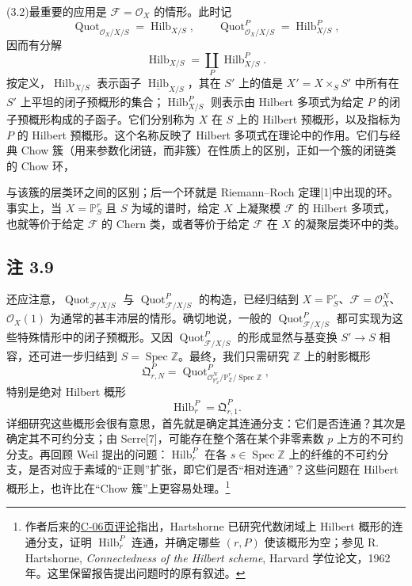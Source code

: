 (3.2)最重要的应用是 $\mathcal F=\mathcal O_X$ 的情形。此时记
\[
\operatorname{Quot}_{\mathcal O_X/X/S}=\operatorname{Hilb}_{X/S},\qquad
\operatorname{Quot}^P_{\mathcal O_X/X/S}=\operatorname{Hilb}^P_{X/S},
\]
因而有分解
\[
\operatorname{Hilb}_{X/S}=\coprod_P\operatorname{Hilb}^P_{X/S}.
\]
按定义，$\operatorname{Hilb}_{X/S}$ 表示函子 $\underline{\operatorname{Hilb}}_{X/S}$，其在 $S'$ 上的值是 $X'=X\times_SS'$ 中所有在 $S'$ 上平坦的闭子预概形的集合；$\operatorname{Hilb}^P_{X/S}$ 则表示由 Hilbert 多项式为给定 $P$ 的闭子预概形构成的子函子。它们分别称为 $X$ 在 $S$ 上的 Hilbert 预概形，以及指标为 $P$ 的 Hilbert 预概形。这个名称反映了 Hilbert 多项式在理论中的作用。它们与经典 Chow 簇（用来参数化闭链，而非簇）在性质上的区别，正如一个簇的闭链类的 Chow 环，

与该簇的层类环之间的区别；后一个环就是 Riemann--Roch 定理[1]中出现的环。事实上，当 $X=\mathbb P^r_S$ 且 $S$ 为域的谱时，给定 $X$ 上凝聚模 $\mathcal F$ 的 Hilbert 多项式，也就等价于给定 $\mathcal F$ 的 Chern 类，或者等价于给定 $\mathcal F$ 在 $X$ 的凝聚层类环中的类。

\subsection*{注 3.9}
还应注意，$\operatorname{Quot}_{\mathcal F/X/S}$ 与 $\operatorname{Quot}^P_{\mathcal F/X/S}$ 的构造，已经归结到 $X=\mathbb P^r_S$、$\mathcal F=\mathcal O_X^N$、$\mathcal O_X(1)$ 为通常的甚丰沛层的情形。确切地说，一般的 $\operatorname{Quot}^P_{\mathcal F/X/S}$ 都可实现为这些特殊情形中的闭子预概形。又因 $\operatorname{Quot}^P_{\mathcal F/X/S}$ 的形成显然与基变换 $S'\to S$ 相容，还可进一步归结到 $S=\operatorname{Spec}\mathbb Z$。最终，我们只需研究 $\mathbb Z$ 上的射影概形
\[
\mathfrak Q^P_{r,N}
=\operatorname{Quot}^P_{\mathcal O_{\mathbb P^r_{\mathbb Z}}^N/
\mathbb P^r_{\mathbb Z}/\operatorname{Spec}\mathbb Z},
\]
特别是绝对 Hilbert 概形
\[
\operatorname{Hilb}^P_r=\mathfrak Q^P_{r,1}.
\]
详细研究这些概形会很有意思，首先就是确定其连通分支：它们是否连通？其次是确定其不可约分支；由 Serre[7]，可能存在整个落在某个非零素数 $p$ 上方的不可约分支。再回顾 Weil 提出的问题：$\operatorname{Hilb}^P_r$ 在各 $s\in\operatorname{Spec}\mathbb Z$ 上的纤维的不可约分支，是否对应于素域的“正则”扩张，即它们是否“相对连通”？这些问题在 Hilbert 概形上，也许比在“Chow 簇”上更容易处理。\footnote{作者后来的\hyperref[orig:8]{C-06页评论}指出，Hartshorne 已研究代数闭域上 Hilbert 概形的连通分支，证明 $\operatorname{Hilb}^P_r$ 连通，并确定哪些 $(r,P)$ 使该概形为空；参见 R. Hartshorne, \textit{Connectedness of the Hilbert scheme}, Harvard 学位论文，1962年。这里保留报告提出问题时的原有叙述。}

